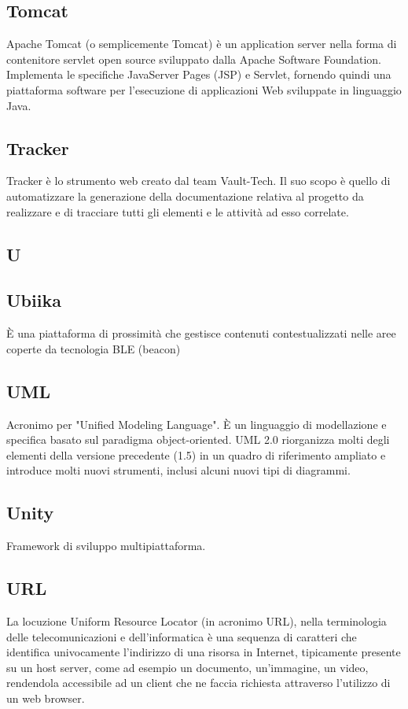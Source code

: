 \subsection{Tomcat}
Apache Tomcat (o semplicemente Tomcat) è un application server nella forma di contenitore servlet open source sviluppato dalla Apache Software Foundation. Implementa le specifiche JavaServer Pages (JSP) e Servlet, fornendo quindi una piattaforma software per l'esecuzione di applicazioni Web sviluppate in linguaggio Java. 

\subsection{Tracker}
Tracker è lo strumento web creato dal team Vault-Tech. Il suo scopo è quello di automatizzare la generazione della documentazione relativa al progetto da realizzare e di tracciare tutti gli elementi e le attività ad esso correlate.

\newpage

\begin{center}
\Huge\section{\uppercase{U}}
\end{center}

\subsection{Ubiika}
È una piattaforma di prossimità che gestisce contenuti contestualizzati nelle
aree coperte da tecnologia BLE (beacon)​

\subsection{UML}
Acronimo per "Unified Modeling Language". È un linguaggio di modellazione e
specifica basato sul paradigma object-oriented. UML 2.0 riorganizza molti degli
elementi della versione precedente (1.5) in un quadro di riferimento ampliato e
introduce molti nuovi strumenti, inclusi alcuni nuovi tipi di diagrammi.

\subsection{Unity}
Framework di sviluppo multipiattaforma.

\subsection{URL}
La locuzione Uniform Resource Locator (in acronimo URL), nella terminologia delle telecomunicazioni e dell'informatica è una sequenza di caratteri che identifica univocamente l'indirizzo di una risorsa in Internet, tipicamente presente su un host server, come ad esempio un documento, un'immagine, un video, rendendola accessibile ad un client che ne faccia richiesta attraverso l'utilizzo di un web browser.

